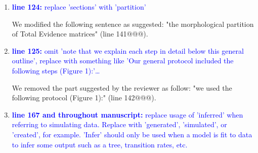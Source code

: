 \documentclass[12pt,letterpaper]{article}
\begin{document}
\begin{enumerate}
(1) - We thank the reviewer for this judicious comment and emphasized on both the novelty aspect of our study and on the questions we are actually testing (see reviewer 1 comment 4 above).

(2) - the second point underlined by the reviewer in this specific comment strikes use as really interesting. However, we considered this study to be already long and complex. We therefore think that adding an extra question to this study (i.e. what is the effect of missing data on the morphological substitution rate parameter estimates?) might loose the reader.
Nonetheless, we added the result of such analysis in the \textbf{Appendix-A Morphological rates estimations results} section.
We linked to this analysis in the methods part as follows:

"The detailed MrBayes parameters are available in Appendix A along with details on the $\alpha$ parameter estimation." lines 336-338 @@@
See also Appendix A "Morphological rates estimations results".

\item{\textcolor{blue}{\textbf{line 124:} replace 'sections' with 'partition'}}

We modified the following sentence as suggested: "the morphological partition of Total Evidence matrices" (line 141@@@).

\item{\textcolor{blue}{\textbf{line 125:} omit 'note that we explain each step in detail below this general outline', replace with something like 'Our general protocol included the following steps (Figure 1):'…}}

We removed the part suggested by the reviewer as follow: "we used the following protocol (Figure 1):" (line 142@@@).

\item{\textcolor{blue}{\textbf{line 167 and throughout manuscript:} replace usage of 'inferred' when referring to simulating data. Replace with 'generated', 'simulated', or 'created', for example. 'Infer' should only be used when a model is fit to data to infer some output such as a tree, transition rates, etc. }}


\end{enumerate}
\end{document}
